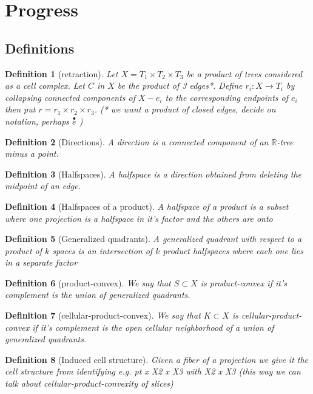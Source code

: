 \documentclass{article}
\theoremstyle{mystyle}
\newtheorem{defn}{Definition}
\theoremstyle{remark}
\begin{document}
\section{Progress}
\label{ss:Definitions}
\subsection{Definitions}
\begin{defn}
	[retraction]
	Let \(X = T_{1} \times T_{2} \times T_{3}\) be a product of trees considered as a cell complex. Let \(C\) in \(X\) be the product of 3 edges*.  Define \(r_{i}: X \to T_{i}\) by collapsing connected components of \(X - e_{i}\) to the corresponding endpoints of \(e_{i}\) then put \(r = r_{1} \times r_{2} \times r_{3}\). (* we want a product of closed edges, decide on notation, perhaps \(\overset{\bullet}{e}\) )
\end{defn}
\begin{defn}[Directions] A {\em direction} is a connected component of an \(\mathbb{R}\)-tree minus a point. 
\end{defn}
\begin{defn}[Halfspaces] A halfspace is a direction obtained from deleting the midpoint of an edge.
\end{defn}
\begin{defn}[Halfspaces of a product] A halfspace of a product is a subset where one projection is a halfspace in it's factor and the others are onto
\end{defn}
\begin{defn}[Generalized quadrants] A generalized quadrant with respect to a product of \(k\) spaces is an intersection of \(k\) product halfspaces where each one lies in a separate factor 
\end{defn}
\begin{defn}[product-convex] We say that \(S\subset X\) is product-convex if it's complement is the union of generalized quadrants.
\end{defn}
\begin{defn}[cellular-product-convex] 
\label{defn:cellular-product-convex}
	We say that \(K \subset X\) is cellular-product-convex if it's complement is the open cellular neighborhood of a union of generalized quadrants.
\end{defn}
\begin{defn}
    [Induced cell structure]
    Given a fiber of a projection we give it the cell structure from identifying e.g. pt x X2 x X3 with X2 x X3 (this way we can talk about cellular-product-convexity of slices)
\end{defn}
\end{document}
